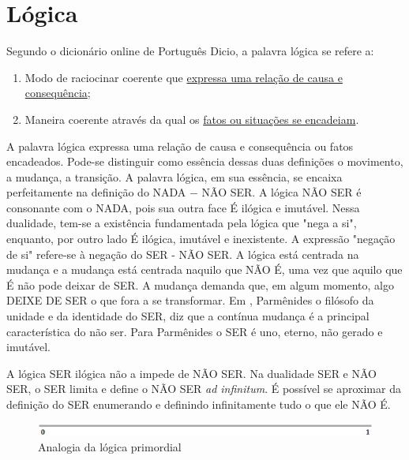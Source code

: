 \section{Lógica}
Segundo o dicionário online de Português Dicio\cite{dicio_logica}, a palavra lógica se refere a:
\begin{enumerate}
   \item Modo de raciocinar coerente que \underline{expressa uma relação de causa e consequência};
   \item Maneira coerente através da qual os \underline{fatos ou situações se encadeiam}. 
 \end{enumerate}
\bigbreak
A palavra lógica expressa uma relação de causa e consequência ou fatos encadeados. Pode-se distinguir como essência dessas duas definições o movimento, a mudança, a transição. A palavra lógica, em sua essência, se encaixa perfeitamente na definição do NADA − NÃO SER.  A lógica NÃO SER é consonante com o NADA, pois sua outra face É ilógica e imutável. Nessa dualidade, tem-se a existência fundamentada pela lógica que "nega a si", enquanto, por outro lado É ilógica, imutável e inexistente. A expressão "negação de si" refere-se à negação do SER - NÃO SER. 
\bigbreak
A lógica está centrada na mudança e a mudança está centrada naquilo que NÃO É, uma vez que aquilo que É não pode deixar de SER. A mudança demanda que, em algum momento, algo DEIXE DE SER o que fora a se transformar. Em , Parmênides  o filósofo da unidade e da identidade do SER, diz que a contínua mudança é a principal característica do não ser. Para Parmênides o SER é uno, eterno, não gerado e imutável.

A lógica SER ilógica não a impede de NÃO SER.  Na dualidade SER e NÃO SER, o SER limita e define o NÃO SER \textit{ad infinitum}. É possível se aproximar da definição do SER enumerando e definindo infinitamente tudo o que ele NÃO É.

\bigbreak
\begin{figure}[hbtp]
\caption{Analogia da lógica primordial}
\label{fig:primordial_logic_representation}
\centering
\includegraphics[scale=1]{sections/images/primordial_logic_representation.jpg}
\end{figure}

